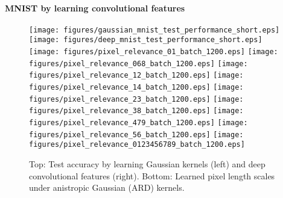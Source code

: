\documentclass[twoside]{article}
\begin{document}
	\paragraph{MNIST by learning convolutional features}
	
		\begin{figure*}[t]
			\centering 
			\texttt{[image: figures/gaussian\_mnist\_test\_performance\_short.eps]}
			\texttt{[image: figures/deep\_mnist\_test\_performance\_short.eps]}
			\texttt{[image: figures/pixel\_relevance\_01\_batch\_1200.eps]}
			\texttt{[image: figures/pixel\_relevance\_068\_batch\_1200.eps]}
			\texttt{[image: figures/pixel\_relevance\_12\_batch\_1200.eps]}
			\texttt{[image: figures/pixel\_relevance\_14\_batch\_1200.eps]}
			\texttt{[image: figures/pixel\_relevance\_23\_batch\_1200.eps]}
			\texttt{[image: figures/pixel\_relevance\_38\_batch\_1200.eps]}
			\texttt{[image: figures/pixel\_relevance\_479\_batch\_1200.eps]}
			\texttt{[image: figures/pixel\_relevance\_56\_batch\_1200.eps]}
			\texttt{[image: figures/pixel\_relevance\_0123456789\_batch\_1200.eps]}
			\caption{Top: Test accuracy by learning Gaussian kernels (left) and deep convolutional features (right). Bottom: Learned pixel length scales under anistropic Gaussian (ARD) kernels.}
			\label{fig:mnist_experiments}
		\end{figure*}
		
\end{document}
